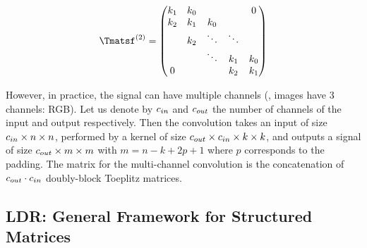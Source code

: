 \begin{equation*}
  \Tmatsf^{(2)} = \leftmatrix
    k_1 & k_0 &         &         & 0       \\
    k_2 & k_1 & k_0 &         &         \\
            & k_2 & \ddots  & \ddots  &         \\
            &         & \ddots  & k_1 & k_0 \\
    0       &         &         & k_2 & k_1 \\
  \rightmatrix
\end{equation*}


However, in practice, the signal can have multiple channels (\eg, images have 3 channels: RGB).
Let us denote by $c_{in}$ and $c_{out}$ the number of channels of the input and output respectively.
Then the convolution takes an input of size $c_{in} \times n \times n$, performed by a kernel of size $c_{out} \times c_{in} \times k \times k$, and outputs a signal of size $c_{out} \times m \times m$ with $m = n - k + 2p + 1$ where $p$ corresponds to the padding.
The matrix for the multi-channel convolution is the concatenation of $c_{out} \cdot c_{in}$ doubly-block Toeplitz matrices.





\subsection{LDR: General Framework for Structured Matrices}
\label{subsection:ch2-general_frameworks_for_structured_matrices}



